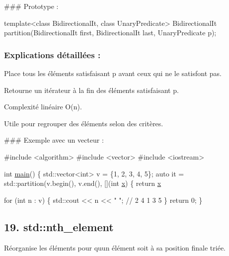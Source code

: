 \#\#\# Prototype \+: 
\begin{DoxyCode}
\textcolor{keyword}{template}<\textcolor{keyword}{class} B\textcolor{keywordtype}{id}irectionalIt, \textcolor{keyword}{class} UnaryPredicate>
BidirectionalIt partition(BidirectionalIt first, BidirectionalIt last, UnaryPredicate p);
\end{DoxyCode}


\subsubsection*{Explications détaillées \+:}


\begin{DoxyItemize}
\item Place tous les éléments satisfaisant {\ttfamily p} avant ceux qui ne le satisfont pas.
\item Retourne un itérateur à la fin des éléments satisfaisant {\ttfamily p}.
\item Complexité linéaire O(n).
\item Utile pour regrouper des éléments selon des critères.
\end{DoxyItemize}

\#\#\# Exemple avec un vecteur \+: 
\begin{DoxyCode}
\textcolor{preprocessor}{#include <algorithm>}
\textcolor{preprocessor}{#include <vector>}
\textcolor{preprocessor}{#include <iostream>}

\textcolor{keywordtype}{int} \hyperlink{htop_8c_a3c04138a5bfe5d72780bb7e82a18e627}{main}() \{
    std::vector<int> v = \{1, 2, 3, 4, 5\};
    \textcolor{keyword}{auto} it = std::partition(v.begin(), v.end(), [](\textcolor{keywordtype}{int} \hyperlink{addition_8c_a6150e0515f7202e2fb518f7206ed97dc}{x}) \{ \textcolor{keywordflow}{return} \hyperlink{addition_8c_a6150e0515f7202e2fb518f7206ed97dc}{x} %

    \textcolor{keywordflow}{for} (\textcolor{keywordtype}{int} n : v) \{
        std::cout << n << \textcolor{stringliteral}{" "}; \textcolor{comment}{// 2 4 1 3 5}
    \}
    \textcolor{keywordflow}{return} 0;
\}
\end{DoxyCode}
 



\subsection*{19. {\bfseries std\+::nth\+\_\+element}}

Réorganise les éléments pour qu\textquotesingle{}un élément soit à sa position finale triée.

